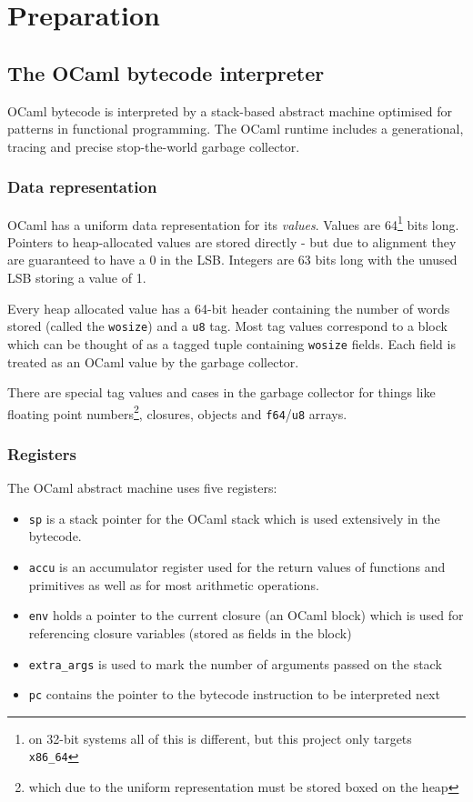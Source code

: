 \chapter{Preparation}

\section{The OCaml bytecode interpreter}

OCaml bytecode is interpreted by a stack-based abstract machine optimised for patterns in
functional programming. The OCaml runtime includes a generational, tracing and precise
stop-the-world garbage collector.

\subsection{Data representation}

OCaml has a uniform data representation for its \emph{values}. Values are 64\footnote{on 32-bit
    systems all of this is different, but this project only targets \texttt{x86\_64}} bits long.
Pointers to heap-allocated values are stored directly - but due to alignment they are guaranteed to
have a 0 in
the LSB. Integers are 63 bits long with the unused LSB storing a value of 1.

Every heap allocated value has a 64-bit header containing the number of words stored (called
the \texttt{wosize}) and a \texttt{u8} tag. Most tag values correspond to a block which can be
thought of as a tagged tuple containing \texttt{wosize} fields. Each field is treated as an OCaml
value by the garbage collector.

There are special tag values and cases in the garbage collector for things like floating point
numbers\footnote{which due to the uniform representation must be stored boxed on the heap},
closures, objects and \texttt{f64}/\texttt{u8} arrays.

\subsection{Registers}

The OCaml abstract machine uses five registers:

\begin{itemize}
    \item \texttt{sp} is a stack pointer for the OCaml stack which is used extensively
          in the bytecode.
    \item \texttt{accu} is an accumulator register used for the return values of functions
          and primitives as well as for most arithmetic operations.
    \item \texttt{env} holds a pointer to the current closure (an OCaml block) which is used for
          referencing closure variables (stored as fields in the block)
    \item \texttt{extra\_args} is used to mark the number of arguments passed on the stack
    \item \texttt{pc} contains the pointer to the bytecode instruction to be interpreted next
\end{itemize}

